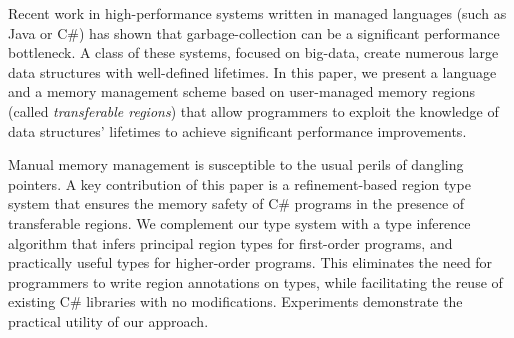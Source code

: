 Recent work in high-performance systems written in managed languages
(such as Java or C\#) has shown that garbage-collection can be a
significant performance bottleneck.  A class of these systems, focused
on big-data, create numerous large data structures with well-defined
lifetimes.  In this paper, we present a language and a memory
management scheme based on user-managed memory regions (called
\emph{transferable regions}) that allow programmers to exploit the
knowledge of data structures' lifetimes to achieve significant
performance improvements.

Manual memory management is susceptible to the usual perils of
dangling pointers. A key contribution of this paper is a
refinement-based region type system that ensures the memory safety of
C\# programs in the presence of transferable regions. We complement
our type system with a type inference algorithm that infers principal
region types for first-order programs, and practically useful types
for higher-order programs. This eliminates the need for programmers to
write region annotations on types, while facilitating the reuse of
existing C\# libraries with no modifications. Experiments demonstrate
the practical utility of our approach.
